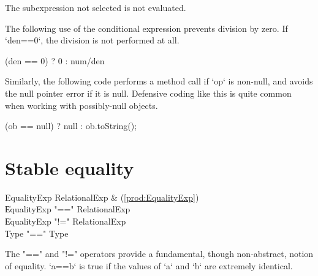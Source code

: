 The subexpression not selected is not evaluated.

\begin{ex}
The following use of the conditional expression prevents division by zero.  If
\xcd`den==0`, the division is not performed at all.
\begin{xten}
(den == 0) ? 0 : num/den
\end{xten}

Similarly, the following code performs a method call if \xcd`op` is non-null,
and avoids the null pointer error if it is null.  Defensive coding like this
is quite common when working with possibly-null objects.
\begin{xten}
(ob == null) ? null : ob.toString();
\end{xten}



\end{ex}

\section{Stable equality}
\label{StableEquality}
\index{\Xcd{==}}

\begin{bbgrammar}
 EqualityExp    \: RelationalExp & (\ref{prod:EqualityExp})\\
    \| EqualityExp \xcd"==" RelationalExp\\
    \| EqualityExp \xcd"!=" RelationalExp\\
    \| Type  \xcd"==" Type \\
\end{bbgrammar}


The \xcd"==" and \xcd"!=" operators provide a fundamental, though
non-abstract, notion of equality.  \xcd`a==b` is true if the values of \xcd`a`
and \xcd`b` are extremely identical.

